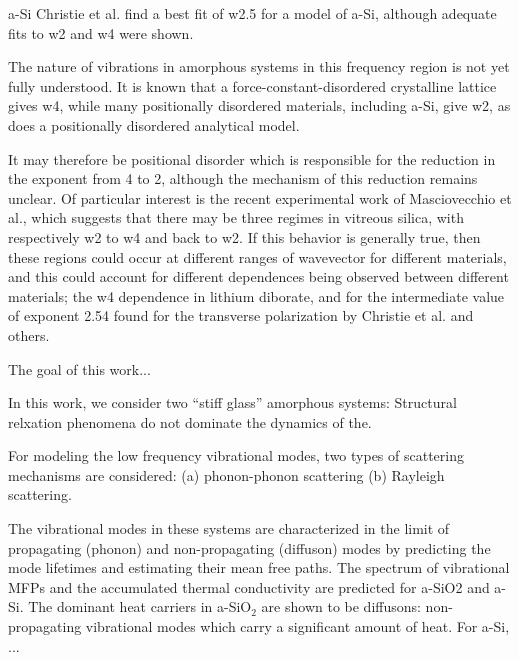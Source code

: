 \documentclass[aps,prb,twocolumn,superscriptaddress,footinbib,amsmath,amssymb,floatfix]{revtex4}
\begin{document}
a-Si
Christie et al. find a best fit of w2.5 for a model of a-Si, although 
adequate fits to w2 and w4 were shown.\cite{christie_vibrational_2007} 

The nature of vibrations in amorphous systems in this
frequency region is not yet fully understood. It is known
that a force-constant-disordered crystalline lattice gives 
w4,\cite{schirmacher_harmonic_1998,taraskin_origin_2001} 
while many positionally disordered materials, including a-Si, 
give w2, as does a positionally disordered analytical model.
\cite{martin-mayor_dynamical_2001,ciliberti_brillouin_2003} 

It may therefore be positional disorder which is responsible 
for the reduction
in the exponent from 4 to 2, although the mechanism of
this reduction remains unclear. Of particular interest is
the recent experimental work of Masciovecchio et al.,
\cite{masciovecchio_evidence_2006}
which suggests that there may be three regimes in vitreous
silica, with respectively w2 to w4 and back to w2. If this
behavior is generally true, then these regions could occur
at different ranges of wavevector for different materials,
and this could account for different dependences being
observed between different materials; the w4 dependence in 
lithium diborate,\cite{ruffle_observation_2003} and for 
the intermediate value
of exponent 2.54 found for the transverse polarization
by Christie et al.\cite{christie_vibrational_2007} and others.


The goal of this work...

In this work, we consider two ``stiff glass'' amorphous systems:
Structural relxation phenomena do not dominate the dynamics 
of the.\cite{gotze_evolution_2000} 

For modeling the low frequency vibrational modes, two types of 
scattering mechanisms are considered: (a) phonon-phonon 
scattering (b) Rayleigh scattering.

The vibrational modes in these systems are
characterized in the limit of propagating (phonon) and 
non-propagating (diffuson) modes by predicting the mode lifetimes and 
estimating their mean free paths. 
The spectrum of vibrational MFPs and the accumulated thermal conductivity 
are predicted for a-SiO2 and a-Si. 
The dominant heat carriers in a-SiO$_2$ are shown to be diffusons: 
non-propagating vibrational modes which carry a significant amount 
of heat. For a-Si, ...

\end{document}
